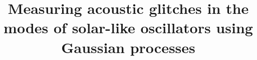 \documentclass[linenumbers,modern,astrosymb,times]{aastex631dm}
\begin{document}
\title{
    Measuring acoustic glitches in the modes of solar-like oscillators
    using Gaussian processes
}


\end{document}
